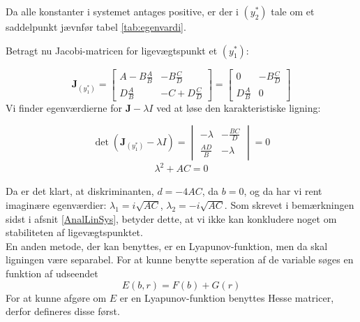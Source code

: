 


Da alle konstanter i systemet antages positive, er der i $\left(y_2^* \right)$ tale om et saddelpunkt jævnfør tabel \ref{tab:egenvardi}. 
\hfill \break

Betragt nu Jacobi-matricen for ligevægtspunkt  et $(y_1^*)$:

$$
\textbf{J}_{\left(y_1^*\right)} = \begin{bmatrix}
A - B\frac{A}{B} & -B\frac{C}{D}\\
D\frac{A}{B} & -C + D\frac{C}{D}
\end{bmatrix} = \begin{bmatrix}
0 & -B\frac{C}{D}\\
D\frac{A}{B} & 0
\end{bmatrix}
$$
Vi finder egenværdierne for $\textbf{J} - \lambda I$ ved at løse den karakteristiske ligning:

$$
\det\left(\textbf{J}_{\left(y_1^* \right)}-\lambda I\right)  =
\begin{vmatrix}
-\lambda & -\frac{BC}{D}\\
\frac{AD}{B} &  -\lambda
\end{vmatrix}=0
$$
\begin{align*} 
     \lambda^2 + AC = 0 
\end{align*}

Da er det klart, at diskriminanten, $d = -4AC$, da $b=0$, og da har vi rent imaginære egenværdier: 
$ \lambda_1 = i\sqrt{AC}$, $\lambda_2 = -i\sqrt{AC}$. Som skrevet i bemærkningen sidst i afsnit \ref{AnalLinSys}, betyder dette, at vi ikke kan konkludere noget om stabiliteten af ligevægtspunktet. \\ \hfill \break
En anden metode, der kan benyttes, er en Lyapunov-funktion, men da skal ligningen være separabel. For at kunne benytte seperation af de variable søges en funktion af udseendet
$$E(b,r)=F(b)+G(r)$$
\hfill \break
For at kunne afgøre om $E$ er en Lyapunov-funktion benyttes Hesse matricer, derfor defineres disse først.

